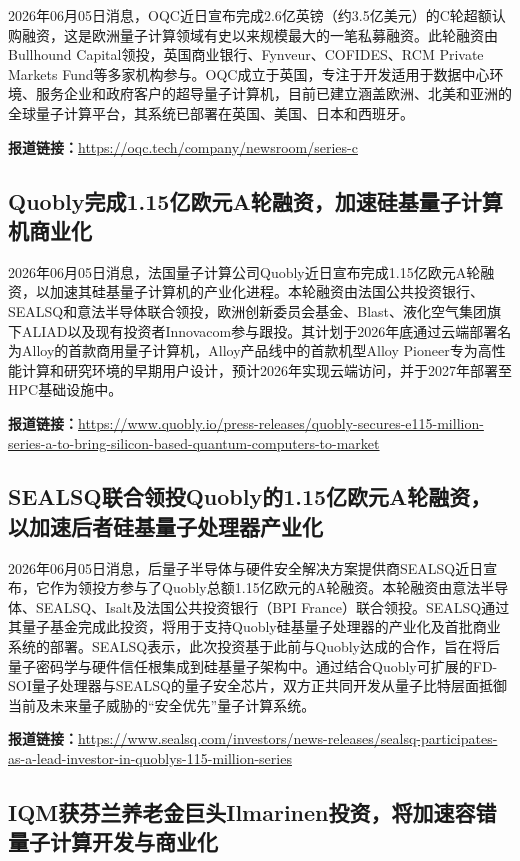\documentclass[12pt,a4paper]{ctexart}
\begin{document}
2026年06月05日消息，OQC近日宣布完成2.6亿英镑（约3.5亿美元）的C轮超额认购融资，这是欧洲量子计算领域有史以来规模最大的一笔私募融资。此轮融资由Bullhound Capital领投，英国商业银行、Fynveur、COFIDES、RCM Private Markets Fund等多家机构参与。OQC成立于英国，专注于开发适用于数据中心环境、服务企业和政府客户的超导量子计算机，目前已建立涵盖欧洲、北美和亚洲的全球量子计算平台，其系统已部署在英国、美国、日本和西班牙。

\noindent\textbf{报道链接：}\url{https://oqc.tech/company/newsroom/series-c}

\subsection{ Quobly完成1.15亿欧元A轮融资，加速硅基量子计算机商业化 }

2026年06月05日消息，法国量子计算公司Quobly近日宣布完成1.15亿欧元A轮融资，以加速其硅基量子计算机的产业化进程。本轮融资由法国公共投资银行、SEALSQ和意法半导体联合领投，欧洲创新委员会基金、Blast、液化空气集团旗下ALIAD以及现有投资者Innovacom参与跟投。其计划于2026年底通过云端部署名为Alloy的首款商用量子计算机，Alloy产品线中的首款机型Alloy Pioneer专为高性能计算和研究环境的早期用户设计，预计2026年实现云端访问，并于2027年部署至HPC基础设施中。

\noindent\textbf{报道链接：}\url{https://www.quobly.io/press-releases/quobly-secures-e115-million-series-a-to-bring-silicon-based-quantum-computers-to-market}

\subsection{ SEALSQ联合领投Quobly的1.15亿欧元A轮融资，以加速后者硅基量子处理器产业化 }

2026年06月05日消息，后量子半导体与硬件安全解决方案提供商SEALSQ近日宣布，它作为领投方参与了Quobly总额1.15亿欧元的A轮融资。本轮融资由意法半导体、SEALSQ、Isalt及法国公共投资银行（BPI France）联合领投。SEALSQ通过其量子基金完成此投资，将用于支持Quobly硅基量子处理器的产业化及首批商业系统的部署。SEALSQ表示，此次投资基于此前与Quobly达成的合作，旨在将后量子密码学与硬件信任根集成到硅基量子架构中。通过结合Quobly可扩展的FD-SOI量子处理器与SEALSQ的量子安全芯片，双方正共同开发从量子比特层面抵御当前及未来量子威胁的“安全优先”量子计算系统。

\noindent\textbf{报道链接：}\url{https://www.sealsq.com/investors/news-releases/sealsq-participates-as-a-lead-investor-in-quoblys-115-million-series}

\subsection{ IQM获芬兰养老金巨头Ilmarinen投资，将加速容错量子计算开发与商业化 }
\end{document}

